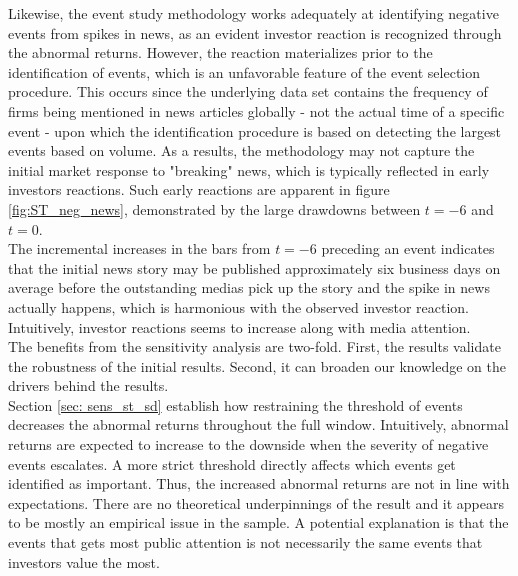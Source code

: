 Likewise, the event study methodology works adequately at identifying negative events from spikes in news, as an evident investor reaction is recognized through the abnormal returns. However, the reaction materializes prior to the identification of events, which is an unfavorable feature of the event selection procedure. This occurs since the underlying data set contains the frequency of firms being mentioned in news articles globally - not the actual time of a specific event - upon which the identification procedure is based on detecting the largest events based on volume. As a results, the methodology may not capture the initial market response to "breaking" news, which is typically reflected in early investors reactions. Such early reactions are apparent in figure \ref{fig:ST_neg_news}, demonstrated by the large drawdowns between $t = -6$ and $t = 0$. \\
The incremental increases in the bars from $t=-6$ preceding an event indicates that the initial news story may be published approximately six business days on average before the outstanding medias pick up the story and the spike in news actually happens, which is harmonious with the observed investor reaction. Intuitively, investor reactions seems to increase along with media attention. \\

The benefits from the sensitivity analysis are two-fold. First, the results validate the robustness of the initial results. Second, it can broaden our knowledge on the drivers behind the results. \\

Section \ref{sec: sens_st_sd} establish how restraining the threshold of events decreases the abnormal returns throughout the full window. Intuitively, abnormal returns are expected to increase to the downside when the severity of negative events escalates. A more strict threshold directly affects which events get identified as important. Thus, the increased abnormal returns are not in line with expectations. There are no theoretical underpinnings of the result and it appears to be mostly an empirical issue in the sample. A potential explanation is that the events that gets most public attention is not necessarily the same events that investors value the most. 


